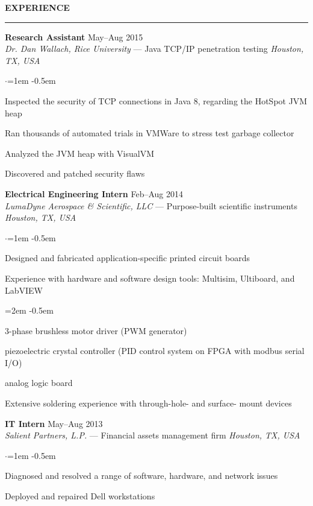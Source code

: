 \documentclass[10pt, a4paper]{article}
\newenvironment{aSection}[1]{
    \medskip \textbf{\uppercase{#1}}
    \smallskip
    \hrule
    \begin{list}{}{
            \setlength{\leftmargin}{1.5em}
        }
    \item[]
    }{
    \end{list}
}
\newenvironment{expSubsection}[4]{
    \textbf{#3} \hfill {#2} \\
    {#1} \hfill \textit{#4}
    \smallskip
    \begin{list}{$\cdot$}{\leftmargin=1em}
    \itemsep -0.5em \vspace{-0.5em}
    }{
    \end{list}
    \vspace{0.5em}
}
\newenvironment{subList}{
    \begin{list}{\raisebox{.4ex}{\tiny$\succ$}}{\leftmargin=2em}
    \itemsep -0.5em \vspace{-0.5em}
    }{
    \end{list}
}
\begin{document}
\begin{aSection}{Experience}
    \begin{expSubsection}
        {\textit{Dr. Dan Wallach, Rice University} --- Java TCP/IP penetration testing}
        {May--Aug 2015}
        {Research Assistant}
        {Houston, TX, USA}
    \item Inspected the security of TCP connections in Java 8, regarding the HotSpot JVM heap
    \item Ran thousands of automated trials in VMWare to stress test garbage collector
    \item Analyzed the JVM heap with VisualVM
    \item Discovered and patched security flaws
    \end{expSubsection}

    \begin{expSubsection}
        {\textit{LumaDyne Aerospace \& Scientific, LLC} --- Purpose-built scientific
        instruments}
        {Feb--Aug 2014}
        {Electrical Engineering Intern}
        {Houston, TX, USA}
    \item Designed and fabricated application-specific printed circuit boards
    \item Experience with hardware and software design tools: Multisim, Ultiboard, and LabVIEW
        \begin{subList}
            \item 3-phase brushless motor driver (PWM generator)
            \item piezoelectric crystal controller (PID control system on FPGA
                with modbus serial I/O)
            \item analog logic board
        \end{subList}
    \item Extensive soldering experience with through-hole- and surface-
        mount devices
    \end{expSubsection}

    \begin{expSubsection}
        {\textit{Salient Partners, L.P.} --- Financial assets management firm}
        {May--Aug 2013}
        {IT Intern}
        {Houston, TX, USA}
    \item Diagnosed and resolved a range of software, hardware, and network issues
    \item Deployed and repaired Dell workstations
    \end{expSubsection}
\end{aSection}
\end{document}
